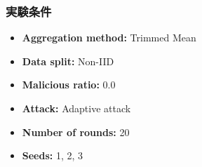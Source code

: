 \documentclass[a4j,twocolumn,dvipdfmx]{jsarticle}
\begin{document}
\subsubsection{実験条件}

\begin{itemize}
    \item \textbf{Aggregation method:} Trimmed Mean
    \item \textbf{Data split:} Non-IID
    \item \textbf{Malicious ratio:} 0.0
    \item \textbf{Attack:} Adaptive attack
    \item \textbf{Number of rounds:} 20
    \item \textbf{Seeds:} 1, 2, 3
\end{itemize}

\end{document}
